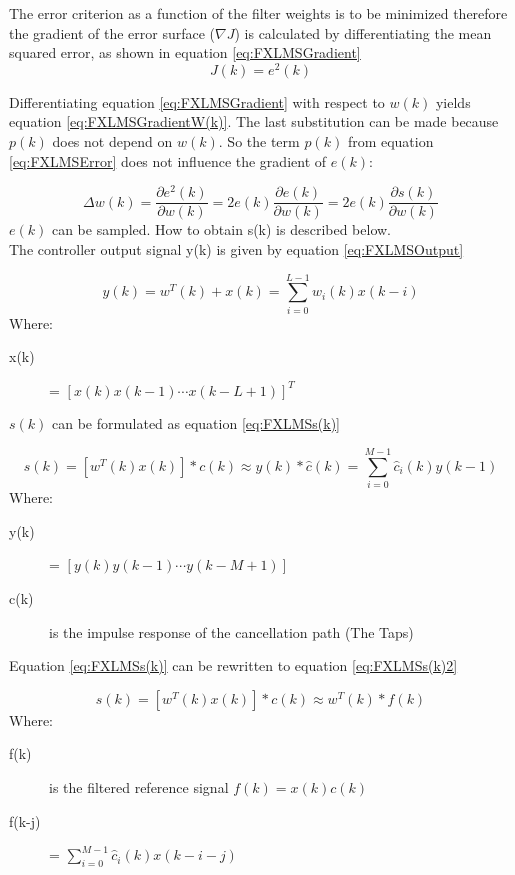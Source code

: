 The error criterion as a function of the filter weights is to be minimized therefore the gradient of the error surface ($\nabla J$) is calculated by differentiating the mean squared error, as shown in equation \ref{eq:FXLMSGradient} 
\begin{equation}\label{eq:FXLMSGradient}
J(k) = e^2(k)
\end{equation}

Differentiating equation \ref{eq:FXLMSGradient} with respect to $w(k)$ yields equation \ref{eq:FXLMSGradientW(k)}. The last substitution can be made because $p(k)$ does not depend on $w(k)$. So the term $p(k)$ from equation \ref{eq:FXLMSError} does not influence the gradient of $e(k)$:

\begin{equation}\label{eq:FXLMSGradientW(k)}
\Delta w(k) = \frac{\partial e^2(k)}{\partial w(k)} = 2e(k)\frac{\partial e(k)}{\partial w(k)} = 2e(k)\frac{\partial s(k)}{\partial w(k)}
\end{equation}
$e(k)$ can be sampled. How to obtain s(k) is described below. \\
The controller output signal y(k) is given by equation \ref{eq:FXLMSOutput} 

\begin{equation}\label{eq:FXLMSOutput}
y(k) = w^T(k) + x(k) = \sum_{i=0}^{L-1} w_i(k)x(k-i)
\end{equation}
Where:
\begin{description}
	\item[x(k)] = $[x(k) x(k-1) \cdots x(k-L+1)]^T $
\end{description}
$s(k)$ can be formulated as equation \ref{eq:FXLMSs(k)}

\begin{equation}\label{eq:FXLMSs(k)}
s(k) = [w^T(k)x(k)]*c(k)\approx y(k)*\hat{c}(k) = \sum_{i=0}^{M-1}\hat{c}_i(k)y(k-1)
\end{equation}
Where:
\begin{description}
	\item[y(k)] = $[ y(k) y(k-1) \cdots y(k-M+1)]$
	\item[c(k)] is the impulse response of the cancellation path (The Taps)
\end{description}

Equation \ref{eq:FXLMSs(k)} can be rewritten to equation \ref{eq:FXLMSs(k)2}

\begin{equation}\label{eq:FXLMSs(k)2}
s(k) = [w^T(k)x(k)]*c(k)\approx w^T(k)*f(k)
\end{equation}
Where:
\begin{description}
	\item[f(k)] is the filtered reference signal $f(k)=x(k)c(k)$
	\item[f(k-j)] = $\sum_{i=0}^{M-1}\hat{c}_i(k)x(k-i-j)$
\end{description}

